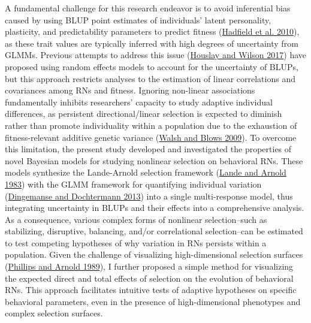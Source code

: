 \documentclass{article}
\begin{document}
A fundamental challenge for this research endeavor is to avoid
inferential bias caused by using BLUP point estimates of individuals'
latent personality, plasticity, and predictability parameters to predict
fitness (\protect\hyperlink{ref-Hadfield2010}{Hadfield et al. 2010}), as
these trait values are typically inferred with high degrees of
uncertainty from GLMMs. Previous attempts to address this issue
(\protect\hyperlink{ref-Hous2017}{Houslay and Wilson 2017}) have
proposed using random effects models to account for the uncertainty of
BLUPs, but this approach restricts analyses to the estimation of linear
correlations and covariances among RNs and fitness. Ignoring non-linear
associations fundamentally inhibits researchers' capacity to study
adaptive individual differences, as persistent directional/linear
selection is expected to diminish rather than promote individuality
within a population due to the exhaustion of fitness-relevant additive
genetic variance (\protect\hyperlink{ref-Walsh2009}{Walsh and Blows
2009}). To overcome this limitation, the present study developed and
investigated the properties of novel Bayesian models for studying
nonlinear selection on behavioral RNs. These models synthesize the
Lande-Arnold selection framework
(\protect\hyperlink{ref-Lande1983}{Lande and Arnold 1983}) with the GLMM
framework for quantifying individual variation
(\protect\hyperlink{ref-DingDocht2013}{Dingemanse and Dochtermann 2013})
into a single multi-response model, thus integrating uncertainty in
BLUPs and their effects into a comprehensive analysis. As a consequence,
various complex forms of nonlinear selection--such as stabilizing,
disruptive, balancing, and/or correlational selection--can be estimated
to test competing hypotheses of why variation in RNs persists within a
population. Given the challenge of visualizing high-dimensional
selection surfaces (\protect\hyperlink{ref-Phillips1989}{Phillips and
Arnold 1989}), I further proposed a simple method for visualizing the
expected direct and total effects of selection on the evolution of
behavioral RNs. This approach facilitates intuitive tests of adaptive
hypotheses on specific behavioral parameters, even in the presence of
high-dimensional phenotypes and complex selection surfaces.
\end{document}
